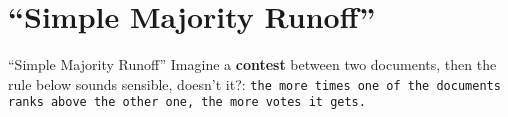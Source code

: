 \documentclass{beamer}
\begin{document}
        \section{``Simple Majority Runoff''}

        \begin{frame}{``Simple Majority Runoff''}
          Imagine a \textbf{contest} between two documents, then the rule below sounds sensible, doesn't it?: \newline \newline
          \texttt{the more times one of the documents ranks above the other one, the more votes it gets.}
	\end{frame}
\end{document}
